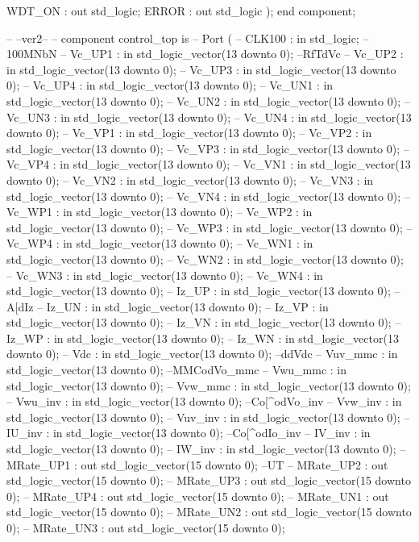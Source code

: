 \begin{mylisting}[language=VHDL,caption=トップモジュール,label=appF_Top_module_VHDL]
			WDT_ON		: out	std_logic;
			ERROR		: out	std_logic
			);
	end component;


--	--ver2--
--	component control_top is
--		Port (
--			CLK100		: in	std_logic;									--100MNbN
--			Vc_UP1		: in	std_logic_vector(13 downto 0);		--RfTdVc
--			Vc_UP2		: in	std_logic_vector(13 downto 0);
--			Vc_UP3		: in	std_logic_vector(13 downto 0);
--			Vc_UP4		: in	std_logic_vector(13 downto 0);
--			Vc_UN1		: in	std_logic_vector(13 downto 0);
--			Vc_UN2		: in	std_logic_vector(13 downto 0);
--			Vc_UN3		: in	std_logic_vector(13 downto 0);
--			Vc_UN4		: in	std_logic_vector(13 downto 0);
--			Vc_VP1		: in	std_logic_vector(13 downto 0);
--			Vc_VP2		: in	std_logic_vector(13 downto 0);
--			Vc_VP3		: in	std_logic_vector(13 downto 0);
--			Vc_VP4		: in	std_logic_vector(13 downto 0);
--			Vc_VN1		: in	std_logic_vector(13 downto 0);
--			Vc_VN2		: in	std_logic_vector(13 downto 0);
--			Vc_VN3		: in	std_logic_vector(13 downto 0);
--			Vc_VN4		: in	std_logic_vector(13 downto 0);
--			Vc_WP1		: in	std_logic_vector(13 downto 0);
--			Vc_WP2		: in	std_logic_vector(13 downto 0);
--			Vc_WP3		: in	std_logic_vector(13 downto 0);
--			Vc_WP4		: in	std_logic_vector(13 downto 0);
--			Vc_WN1		: in	std_logic_vector(13 downto 0);
--			Vc_WN2		: in	std_logic_vector(13 downto 0);
--			Vc_WN3		: in	std_logic_vector(13 downto 0);
--			Vc_WN4		: in	std_logic_vector(13 downto 0);
--			Iz_UP			: in	std_logic_vector(13 downto 0);		--A[dIz
--			Iz_UN			: in	std_logic_vector(13 downto 0);
--			Iz_VP			: in	std_logic_vector(13 downto 0);
--			Iz_VN			: in	std_logic_vector(13 downto 0);
--			Iz_WP			: in	std_logic_vector(13 downto 0);
--			Iz_WN			: in	std_logic_vector(13 downto 0);
--			Vdc			: in	std_logic_vector(13 downto 0);			--ddVdc
--			Vuv_mmc		: in	std_logic_vector(13 downto 0);		--MMCodVo_mmc
--			Vwu_mmc		: in	std_logic_vector(13 downto 0);
--			Vvw_mmc		: in	std_logic_vector(13 downto 0);
--			Vwu_inv		: in	std_logic_vector(13 downto 0);		--Co[^odVo_inv
--			Vvw_inv		: in	std_logic_vector(13 downto 0);
--			Vuv_inv		: in	std_logic_vector(13 downto 0);
--			IU_inv		: in	std_logic_vector(13 downto 0);		--Co[^odIo_inv
--			IV_inv		: in	std_logic_vector(13 downto 0);
--			IW_inv		: in	std_logic_vector(13 downto 0);
--			MRate_UP1	: out	std_logic_vector(15 downto 0);		--UT
--			MRate_UP2	: out	std_logic_vector(15 downto 0);
--			MRate_UP3	: out	std_logic_vector(15 downto 0);
--			MRate_UP4	: out	std_logic_vector(15 downto 0);
--			MRate_UN1	: out	std_logic_vector(15 downto 0);
--			MRate_UN2	: out	std_logic_vector(15 downto 0);
--			MRate_UN3	: out	std_logic_vector(15 downto 0);

\end{mylisting}
